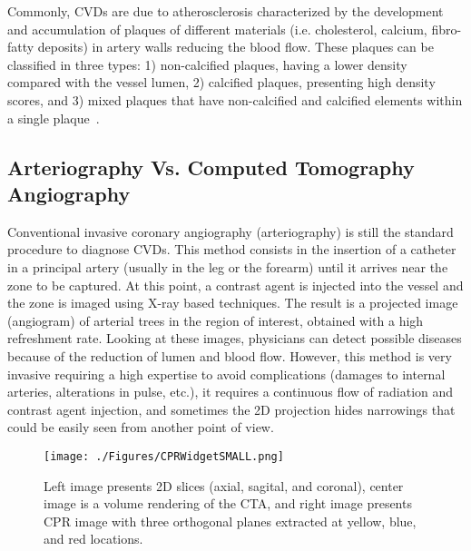 Commonly, CVDs are due to atherosclerosis characterized by the development and accumulation of plaques of different materials (i.e. cholesterol, calcium, fibro-fatty deposits) in artery walls reducing the blood flow. These plaques can be classified in three types: 1) non-calcified plaques, having a lower density compared with the vessel lumen, 2) calcified plaques, presenting high density scores, and 3) mixed plaques that have non-calcified and calcified elements within a single plaque~\citep{Pundziute2007}.

\subsection{Arteriography Vs. Computed Tomography Angiography }
%
Conventional invasive coronary angiography (arteriography) is still the standard procedure to diagnose CVDs. This method consists in the insertion of a catheter in a principal artery (usually in the leg or the forearm) until it arrives near the zone to be captured. At this point, a contrast agent is injected into the vessel and the zone is imaged using X-ray based techniques. The result is a projected image (angiogram) of arterial trees in the region of interest, obtained with a high refreshment rate. Looking at these images, physicians can detect possible diseases because of the reduction of lumen and blood flow. However, this method is very invasive requiring a high expertise to avoid complications (damages to internal arteries, alterations in pulse, etc.), it requires a continuous flow of radiation and contrast agent  injection, and sometimes the 2D projection hides narrowings that could be easily seen from another point of view.

\begin{figure}[htbp]
	\centering
		\texttt{[image: ./Figures/CPRWidgetSMALL.png]}
	\caption[Visualization techniques for coronary arteries analysis.]{Left image presents 2D slices (axial, sagital, and coronal), center image is a volume rendering of the CTA, and right image presents CPR image with three orthogonal planes extracted at yellow, blue, and red locations.}
	\label{fig:CPRWidget}
\end{figure}

